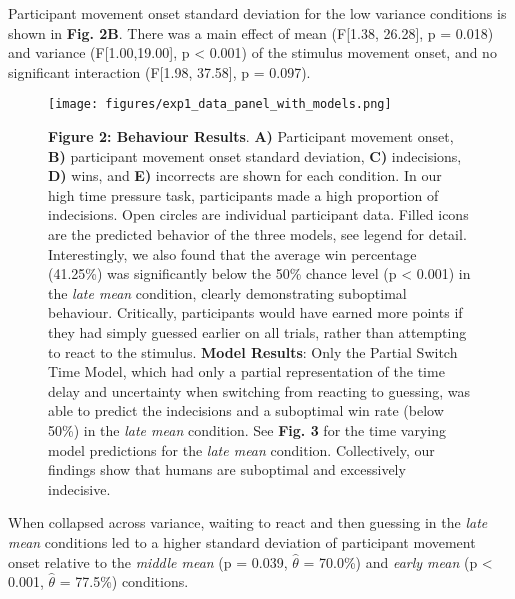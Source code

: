 \documentclass[12pt]{article}
\newcommand\boldblue[1]{\textcolor{mydarkblue}{\textbf{#1}}}
\begin{document}
Participant movement onset standard deviation for the low variance conditions is shown in \boldblue{Fig. 2B}. There was a main effect of mean (F[1.38, 26.28], p = 0.018) and variance (F[1.00,19.00], p < 0.001) of the stimulus movement onset, and no significant interaction (F[1.98, 37.58], p = 0.097). 

\begin{figure}[H]
  \begin{minipage}[c][\pdfpageheight][t]{0.5\textwidth}

      \texttt{[image: figures/exp1\_data\_panel\_with\_models.png]}
  \end{minipage}\hfill
  \begin{minipage}[c][\pdfpageheight][t]{0.5\textwidth}
      \caption*{
        \boldblue{Figure 2: Behaviour Results}. \boldblue{A)} Participant movement onset, \boldblue{B)} participant movement onset standard deviation, \boldblue{C)} indecisions, \boldblue{D)} wins, and \boldblue{E)} incorrects are shown for each condition. In our high time pressure task, participants made a high proportion of indecisions. Open circles are individual participant data. Filled icons are the predicted behavior of the three models, see legend for detail. Interestingly, we also found that the average win percentage (41.25\%) was significantly below the 50\% chance level (p < 0.001) in the \emph{late mean} condition, clearly demonstrating suboptimal behaviour. Critically, participants would have earned more points if they had simply guessed earlier on all trials, rather than attempting to react to the stimulus. \boldblue{Model Results}: Only the Partial Switch Time Model, which had only a partial representation of the time delay and uncertainty when switching from reacting to guessing, was able to predict the indecisions and a suboptimal win rate (below 50\%) in the \emph{late mean} condition. See \boldblue{Fig. 3} for the time varying model predictions for the \emph{late mean} condition. Collectively, our findings show that humans are suboptimal and excessively indecisive.} 
  \end{minipage}
\end{figure}

\noindent When collapsed across variance, waiting to react and then guessing in the \emph{late mean} conditions led to a higher standard deviation of participant movement onset relative to the \emph{middle mean} (p = 0.039, $\hat{\theta}$ = 70.0\%) and \emph{early mean} (p < 0.001, $\hat{\theta}$ = 77.5\%) conditions.
\end{document}
